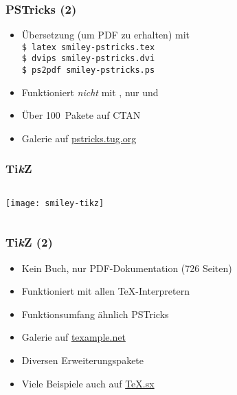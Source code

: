 \begin{frame}
  \frametitle{PSTricks (2)}
  \begin{itemize}
  \item Übersetzung (um PDF zu erhalten) mit\\
    \texttt{\$ latex smiley-pstricks.tex}\\
    \texttt{\$ dvips smiley-pstricks.dvi}\\
    \texttt{\$ ps2pdf smiley-pstricks.ps}
  \item Funktioniert \emph{nicht} mit , nur
     und 
  \item Über 100~Pakete auf CTAN
  \item Galerie auf \href{http://pstricks.tug.org}{pstricks.tug.org}
  \end{itemize}
  \begingroup
  \printbibliography[heading=none,keyword=graphic]
  \endgroup
\end{frame}

\begin{frame}
  \frametitle{Ti\emph{k}Z}
  \begin{columns}[T]
    \begin{column}{.25\textwidth}
      \texttt{[image: smiley-tikz]}
    \end{column}
    \begin{column}{.75\textwidth}
      TeX}]{examples/graphics/smiley-tikz.tex}
    \end{column}
  \end{columns}
\end{frame}

\begin{frame}
  \frametitle{Ti\emph{k}Z (2)}
  \begin{itemize}
  \item Kein Buch, nur PDF-Dokumentation (726 Seiten)
  \item Funktioniert mit allen \TeX-Interpretern
  \item Funktionsumfang ähnlich PSTricks
  \item Galerie auf \href{http://www.texample.net}{texample.net}
  \item Diversen Erweiterungspakete
  \item Viele Beispiele auch auf \href{http://tex.stackexchange.com}{\TeX.sx}
  \end{itemize}
\end{frame}

